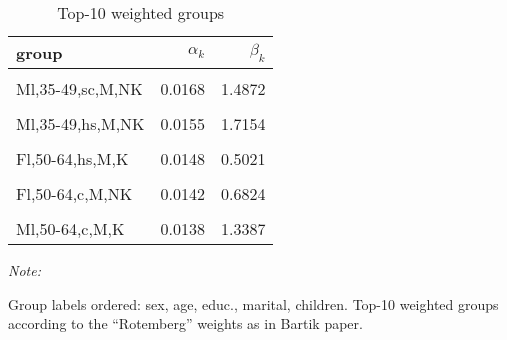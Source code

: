 \begin{table}

\caption{Top-10 weighted groups}
\centering
\begin{threeparttable}
\begin{tabular}[t]{lrr}
\toprule
group & $\alpha_k$ & $\beta_k$\\
\midrule
\cellcolor{gray!6}{Ml,18-24,hs,M,NK} & \cellcolor{gray!6}{0.0313} & \cellcolor{gray!6}{2.0673}\\
\addlinespace
Ml,35-49,sc,M,NK & 0.0168 & 1.4872\\
\addlinespace
\cellcolor{gray!6}{Ml,25-34,hs,M,NK} & \cellcolor{gray!6}{0.0167} & \cellcolor{gray!6}{2.4026}\\
\addlinespace
Ml,35-49,hs,M,NK & 0.0155 & 1.7154\\
\addlinespace
\cellcolor{gray!6}{Fl,18-24,sc,M,K} & \cellcolor{gray!6}{0.0149} & \cellcolor{gray!6}{2.1234}\\
\addlinespace
Fl,50-64,hs,M,K & 0.0148 & 0.5021\\
\addlinespace
\cellcolor{gray!6}{Fl,18-24,<hs,M,NK} & \cellcolor{gray!6}{0.0144} & \cellcolor{gray!6}{1.9555}\\
\addlinespace
Fl,50-64,c,M,NK & 0.0142 & 0.6824\\
\addlinespace
\cellcolor{gray!6}{Fl,18-24,hs,M,NK} & \cellcolor{gray!6}{0.0139} & \cellcolor{gray!6}{2.2342}\\
\addlinespace
Ml,50-64,c,M,K & 0.0138 & 1.3387\\
\bottomrule
\end{tabular}
\begin{tablenotes}
\item \textit{Note: } 
\item Group labels ordered: sex, age, educ., marital, children. Top-10 weighted groups according to the ``Rotemberg'' weights as in Bartik paper.
\end{tablenotes}
\end{threeparttable}
\end{table}
